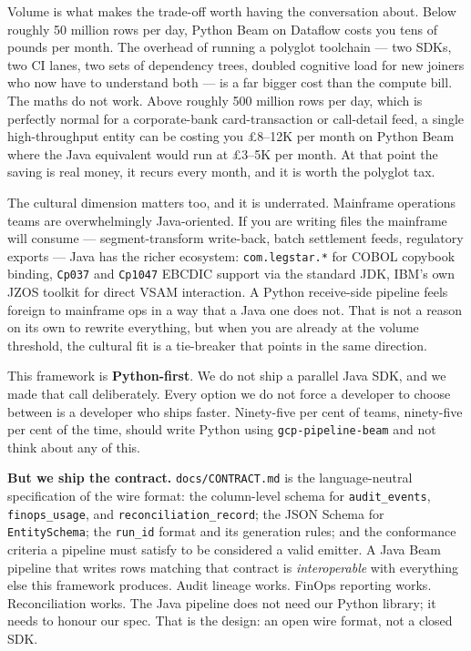 \documentclass[
  11pt,
  british,
  oneside]{book}
\begin{document}
Volume is what makes the trade-off worth having the conversation about.
Below roughly 50 million rows per day, Python Beam on Dataflow costs you
tens of pounds per month. The overhead of running a polyglot toolchain
--- two SDKs, two CI lanes, two sets of dependency trees, doubled
cognitive load for new joiners who now have to understand both --- is a
far bigger cost than the compute bill. The maths do not work. Above
roughly 500 million rows per day, which is perfectly normal for a
corporate-bank card-transaction or call-detail feed, a single
high-throughput entity can be costing you £8--12K per month on Python
Beam where the Java equivalent would run at £3--5K per month. At that
point the saving is real money, it recurs every month, and it is worth
the polyglot tax.

The cultural dimension matters too, and it is underrated. Mainframe
operations teams are overwhelmingly Java-oriented. If you are writing
files the mainframe will consume --- segment-transform write-back, batch
settlement feeds, regulatory exports --- Java has the richer ecosystem:
\texttt{com.legstar.*} for COBOL copybook binding,
\texttt{Cp037} and \texttt{Cp1047} EBCDIC support via the standard JDK,
IBM's own JZOS toolkit for direct VSAM interaction. A Python
receive-side pipeline feels foreign to mainframe ops in a way that a
Java one does not. That is not a reason on its own to rewrite
everything, but when you are already at the volume threshold, the
cultural fit is a tie-breaker that points in the same direction.

This framework is \textbf{Python-first}. We do not ship a parallel Java
SDK, and we made that call deliberately. Every option we do not force a
developer to choose between is a developer who ships faster. Ninety-five
per cent of teams, ninety-five per cent of the time, should write Python
using \texttt{gcp-pipeline-beam} and not think about any of this.

\textbf{But we ship the contract.} \texttt{docs/CONTRACT.md} is the
language-neutral specification of the wire format: the column-level
schema for \texttt{audit\_events}, \texttt{finops\_usage}, and
\texttt{reconciliation\_record}; the JSON Schema for
\texttt{EntitySchema}; the \texttt{run\_id} format and its generation
rules; and the conformance criteria a pipeline must satisfy to be
considered a valid emitter. A Java Beam pipeline that writes rows
matching that contract is \emph{interoperable} with everything else this
framework produces. Audit lineage works. FinOps reporting works.
Reconciliation works. The Java pipeline does not need our Python
library; it needs to honour our spec. That is the design: an open wire
format, not a closed SDK.
\end{document}
